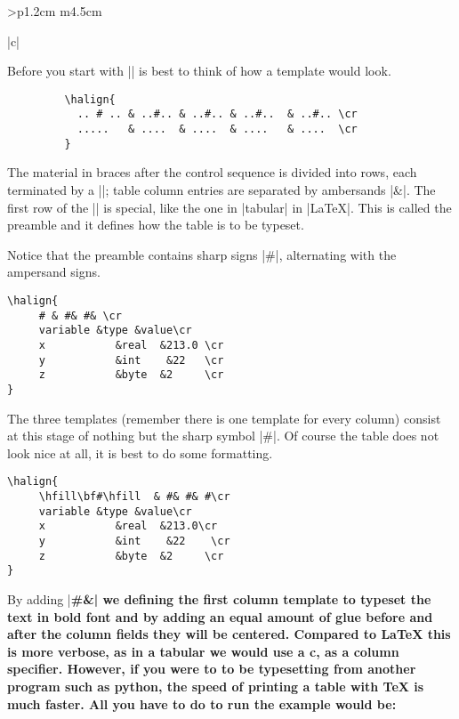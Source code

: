 \begin{tabular}{>{\bfseries}p{1.2cm} m{4.5cm}}
\begin{tabular}[t]{|c|}
\begin{longtable}
\begin{scriptexample}{}{}
Before you start with |\halign| is best to think of how a template would look. 

\begin{verbatim}
         \halign{
           .. # .. & ..#.. & ..#.. & ..#..  & ..#.. \cr
           .....   & ....  & ....  & ....   & ....  \cr
         }
\end{verbatim}


The material in braces after the  control sequence is divided into rows, each terminated by a |\cr|; table column entries are separated by ambersands |&|. The first row of the |\halign| is special, like the one in |tabular| in |LaTeX|.
This is called the preamble and it defines how the table is to be typeset. 

Notice that the preamble contains sharp signs |#|, alternating with the ampersand signs.

\begin{scriptexample}{}{}
\begin{verbatim}
\halign{
     # & #& #& \cr
     variable &type &value\cr
     x           &real  &213.0 \cr 
     y           &int    &22   \cr
     z           &byte  &2     \cr
}
\end{verbatim}
\end{scriptexample}

The three templates (remember there is one template for every column) consist at this stage of nothing but the sharp symbol |#|. Of course the table does not look nice at all, it is best to do some formatting.

\begin{scriptexample}{}{}
\begin{verbatim}
\halign{
     \hfill\bf#\hfill  & #& #& #\cr
     variable &type &value\cr
     x           &real  &213.0\cr 
     y           &int    &22    \cr
     z           &byte  &2     \cr
}
\end{verbatim}
\end{scriptexample}

By adding |\hfil\bf#\hfill &| we defining the first column template to typeset the text in bold font and by adding an equal amount of glue before and after the column fields they will be centered. Compared to LaTeX this is more verbose, as in a tabular we would use a \textbf{c}, as a column specifier. However, if you were to to be typesetting from another program such as python, the speed of printing a table with TeX is much faster. All you have to do to run the example would be:


\end{scriptexample}
\end{longtable}
\end{tabular}
\end{tabular}

